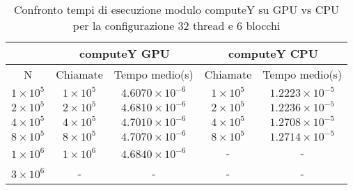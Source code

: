 \begin{table}[ht!]
    \begin{center}
        \renewcommand{\arraystretch}{1.5}
        \begin{adjustbox}{width=.65\textwidth}
            \begin{tabular}{ |c|c|c|c|c| }
                \hline
                \multicolumn{1}{|c}{} & \multicolumn{2}{|c}{computeY GPU} & \multicolumn{2}{|c|}{computeY CPU} \\
                \hline
                N & Chiamate & Tempo medio(s) & Chiamate & Tempo medio(s) \\
                \hline 
                 $1 \times 10^5$ & $1 \times 10^{5}$ & $4.6070 \times 10^{-6}$ & $1 \times 10^5$ & $1.2223 \times 10^{-5}$ \\ 
                \hline 
                 $2 \times 10^5$ & $2 \times 10^{5}$ & $4.6810 \times 10^{-6}$ & $2 \times 10^5$ & $1.2236 \times 10^{-5}$ \\ 
                \hline
                 $4 \times 10^5$ & $4 \times 10^{5}$ & $4.7010 \times 10^{-6}$ & $4 \times 10^5$ & $1.2708 \times 10^{-5}$ \\ 
                \hline 
                 $8 \times 10^5$ & $8 \times 10^{5}$ & $4.7070 \times 10^{-6}$ & $8 \times 10^5$ & $1.2714 \times 10^{-5}$ \\ 
                \hline 
                 $1 \times 10^6$ & $1 \times 10^{6}$ & $4.6840 \times 10^{-6}$ & - & - \\ 
                \hline 
                 $3 \times 10^6$ & - & - & - & - \\ 
                \hline 
            \end{tabular}
        \end{adjustbox}
    \end{center}
    \caption{Confronto tempi di esecuzione modulo computeY su GPU vs CPU per la configurazione 32 thread e 6 blocchi}
    \label{tab:computeY_kernel_table_32x6}
\end{table}

